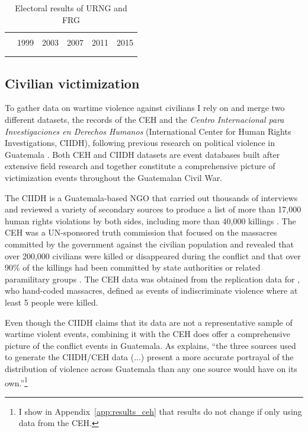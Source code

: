 \documentclass[12pt, notitlepage]{article}
\begin{document}
\vspace{15pt}
\begin{table}[!htbp] \centering
  \caption{Electoral results of URNG and FRG}\label{tab:elec_results}
  \small

  \begin{tabular}{lccccc}
  \\[-1.8ex]\hline
  \hline \\[-1.8ex]
    & 1999 & 2003 & 2007 & 2011 & 2015 \\
  \hline \\[-1.8ex]
  
  \hline
  \hline \\[-1.8ex]
  \end{tabular}

\end{table}

\subsection*{Civilian victimization}

To gather data on wartime violence against civilians I rely on and merge two different datasets, the records of the CEH and the \textit{Centro Internacional para Investigaciones en Derechos Humanos} (International Center for Human Rights Investigations, CIIDH), following previous research on political violence in Guatemala \citep{Chamarbagwala:2011aa, Sullivan:2012aa}.
Both CEH and CIIDH datasets are event databases built after extensive field research and together constitute a comprehensive picture of victimization events throughout the Guatemalan Civil War.

The CIIDH is a Guatemala-based NGO that carried out thousands of interviews and reviewed a variety of secondary sources to produce a list of more than 17,000 human rights violations by both sides, including more than 40,000 killings \citep{Ball:1999aa}.
The CEH was a UN-sponsored truth commission that focused on the massacres committed by the government against the civilian population and revealed that over 200,000 civilians were killed or disappeared during the conflict and that over 90\% of the killings had been committed by state authorities or related paramilitary groups \citep{CEH:1999aa}.
The CEH data was obtained from the replication data for \citet{Sullivan:2012aa}, who hand-coded massacres, defined as events of indiscriminate violence where at least 5 people were killed.%

Even though the CIIDH claims that its data are not a representative sample of wartime violent events, combining it with the CEH does offer a comprehensive picture of the conflict events in Guatemala.
As \citet[382]{Sullivan:2012aa} explains, ``the three sources used to generate the CIIDH/CEH data (...) present a more accurate portrayal of the distribution of violence across Guatemala than any one source would have on its own.''\footnote{I show in Appendix~\ref{app:results_ceh} that results do not change if only using data from the CEH.}
\end{document}
